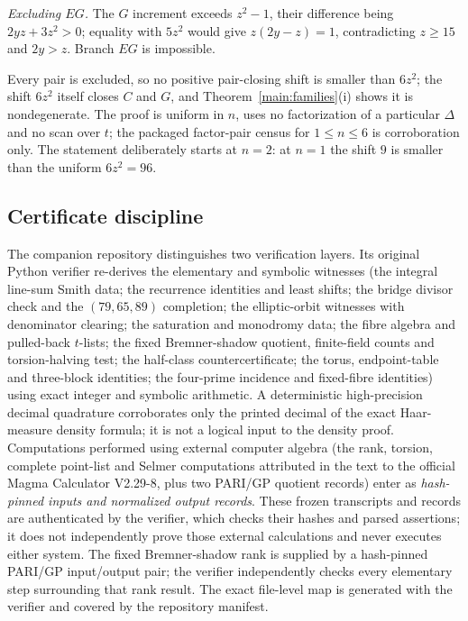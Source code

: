 \emph{Excluding $EG$.} The $G$ increment exceeds $z^2-1$, their difference
being $2yz+3z^2>0$; equality with $5z^2$ would give $z(2y-z)=1$,
contradicting $z\ge15$ and $2y>z$. Branch $EG$ is impossible.

Every pair is excluded, so no positive pair-closing shift is smaller than
$6z^2$; the shift $6z^2$ itself closes $C$ and $G$, and
Theorem~\ref{main:families}(i) shows it is nondegenerate. The proof is
uniform in $n$, uses no factorization of a particular $\Delta$ and no scan
over $t$; the packaged factor-pair census for $1\le n\le6$ is corroboration only.
The statement deliberately starts at $n=2$: at $n=1$ the shift $9$ is
smaller than the uniform $6z^2=96$.

\subsection{Certificate discipline}

The companion repository distinguishes two verification layers. Its original
Python verifier re-derives the elementary and
symbolic witnesses (the integral line-sum Smith data; the recurrence
identities and least shifts; the bridge divisor check and the $(79,65,89)$
completion; the elliptic-orbit witnesses with denominator clearing; the
saturation and monodromy data; the fibre algebra and pulled-back $t$-lists;
the fixed Bremner-shadow quotient, finite-field counts and torsion-halving test;
the half-class countercertificate; the torus, endpoint-table and
three-block identities; the four-prime incidence and fixed-fibre
identities) using exact integer and symbolic arithmetic. A deterministic
high-precision decimal quadrature corroborates only the printed decimal of
the exact Haar-measure density formula; it is not a logical input to the
density proof. Computations
performed using external computer algebra (the rank, torsion, complete
point-list and Selmer computations attributed in the text to the official Magma
Calculator V2.29-8, plus two PARI/GP quotient records) enter as
\emph{hash-pinned inputs and normalized output records}. These frozen
transcripts and records are authenticated by the verifier, which checks
their hashes and parsed assertions; it does not independently prove those
external calculations and never executes either system. The fixed
Bremner-shadow rank is supplied by a hash-pinned PARI/GP input/output pair;
the verifier independently checks every elementary step surrounding that
rank result. The exact file-level
map is generated with the verifier and covered by the repository manifest.
